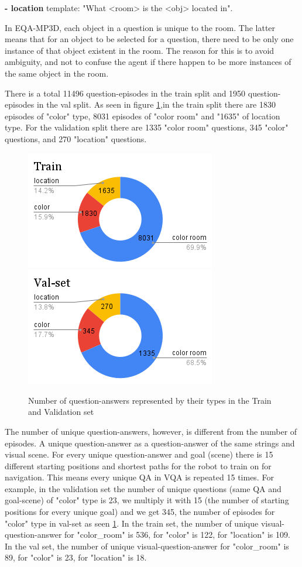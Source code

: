 \textbf{- location} template: "What <room> is the <obj> located in". 

In EQA-MP3D, each object in a question is unique to the room. The latter means that for an object to be selected for a question, there need to be only one instance of that object existent in the room. The reason for this is to avoid ambiguity, and not to confuse the agent if there happen to be more instances of the same object in the room. 

There is a total 11496 question-episodes in the train split and 1950 question-episodes in the val split. As seen in figure \ref{fig:questioncount},in the train split there are 1830 episodes of  "color" type, 8031 episodes of "color room"  and "1635" of location type. For the validation split there are 1335 "color room" questions, 345 "color" questions, and 270 "location" questions. 


\begin{figure}[H]
\centering
\includegraphics[scale=0.45]{images/Train.png}
\includegraphics[scale=0.45]{images/Val-set.png}
\caption{Number of question-answers represented by their types in the Train and Validation set}
\label{fig:questioncount}
\end{figure}

The number of unique question-answers, however, is different from the number of episodes. A unique question-answer as a question-answer of the same strings and visual scene. For every unique question-answer and goal (scene) there is 15 different starting positions and shortest paths for the robot to train on for navigation. This means every unique QA in VQA is repeated 15 times. For example, in the validation set the number of unique questions (same QA and goal-scene) of "color" type  is 23, we multiply it with 15 (the number of starting positions for every unique goal) and we get 345, the number of episodes for "color" type in val-set as seen \ref{fig:questioncount}. In the train set, the number of unique visual-question-answer for "color\_room" is 536, for "color" is 122, for "location" is 109. In the val set, the number  of unique visual-question-answer for "color\_room" is 89, for "color" is 23, for "location" is 18. 


